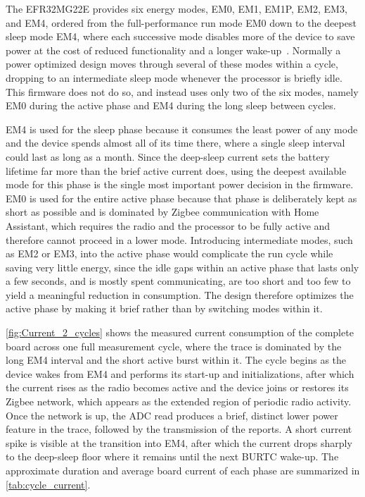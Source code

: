 The EFR32MG22E provides six energy modes, EM0, EM1, EM1P, EM2, EM3, and EM4, ordered from the full-performance run mode EM0 down to the deepest sleep mode EM4, where each successive mode disables more of the device to save power at the cost of reduced functionality and a longer wake-up~\cite{silabs_efr32xg22_reference, silabs_efr32xg22_wireless}.
Normally a power optimized design moves through several of these modes within a cycle, dropping to an intermediate sleep mode whenever the processor is briefly idle.
This firmware does not do so, and instead uses only two of the six modes, namely EM0 during the active phase and EM4 during the long sleep between cycles.

EM4 is used for the sleep phase because it consumes the least power of any mode and the device spends almost all of its time there, where a single sleep interval could last as long as a month.
Since the deep-sleep current sets the battery lifetime far more than the brief active current does, using the deepest available mode for this phase is the single most important power decision in the firmware.
EM0 is used for the entire active phase because that phase is deliberately kept as short as possible and is dominated by Zigbee communication with Home Assistant, which requires the radio and the processor to be fully active and therefore cannot proceed in a lower mode.
Introducing intermediate modes, such as EM2 or EM3, into the active phase would complicate the run cycle while saving very little energy, since the idle gaps within an active phase that lasts only a few seconds, and is mostly spent communicating, are too short and too few to yield a meaningful reduction in consumption.
The design therefore optimizes the active phase by making it brief rather than by switching modes within it.

\cref{fig:Current_2_cycles} shows the measured current consumption of the complete board across one full measurement cycle, where the trace is dominated by the long EM4 interval and the short active burst within it. The cycle begins as the device wakes from EM4 and performs its start-up and initializations, after which the current rises as the radio becomes active and the device joins or restores its Zigbee network, which appears as the extended region of periodic radio activity. Once the network is up, the ADC read produces a brief, distinct lower power feature in the trace, followed by the transmission of the reports. A short current spike is visible at the transition into EM4, after which the current drops sharply to the deep-sleep floor where it remains until the next BURTC wake-up. The approximate duration and average board current of each phase are summarized in \cref{tab:cycle_current}.


